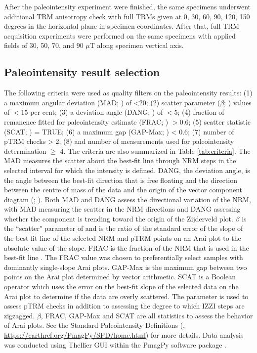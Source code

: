 \documentclass[draft]{agujournal2019}
\begin{document}
After the paleointensity experiment were finished, the same specimens underwent additional TRM anisotropy check with full TRMs given at 0, 30, 60, 90, 120, 150 degrees in the horizontal plane in specimen coordinates. After that, full TRM acquisition experiments were performed on the same specimens with applied fields of 30, 50, 70, and 90 $\mu$T along specimen vertical axis. 

\subsection*{Paleointensity result selection}
The following criteria were used as quality filters on the paleointensity results: (1) a maximum angular deviation (MAD; ) of <20\textdegree; (2) scatter parameter ($\beta$; ) values of $<$15 per cent; (3) a deviation angle (DANG; ) of $<$5\textdegree; (4) fraction of remanence fitted for paleointensity estimate (FRAC; ) $>$0.6; (5) scatter statistic (SCAT; ) = TRUE; (6) a maximum gap (GAP-Max; ) < 0.6; (7) number of pTRM checks > 2; (8) and number of measurements used for paleointensity determination $≥$ 4. The criteria are also summarized in Table \ref{tab:criteria}. The MAD measures the scatter about the best-fit line through NRM steps in the selected interval for which the intensity is defined. DANG, the deviation angle, is the angle between the best-fit direction that is free floating and the direction between the centre of mass of the data and the origin of the vector component diagram (; ). Both MAD and DANG assess the directional variation of the NRM, with MAD measuring the scatter in the NRM directions and DANG assessing whether the component is trending toward the origin of the Zijderveld plot. $\beta$ is the ``scatter" parameter of  and is the ratio of the standard error of the slope of the best-fit line of the selected NRM and pTRM points on an Arai plot to the absolute value of the slope. FRAC is the fraction of the NRM that is used in the best-fit line \cite{Shaar2013a}. The FRAC value was chosen to preferentially select samples with dominantly single-slope Arai plots. GAP-Max is the maximum gap between two points on the Arai plot determined by vector arithmetic. SCAT is a Boolean operator which uses the error on the best-fit slope of the selected data on the Arai plot to determine if the data are overly scattered. The parameter is used to assess pTRM checks in addition to assessing the degree to which IZZI steps are zigzagged. $\beta$, FRAC, GAP-Max and SCAT are all statistics to assess the behavior of Arai plots. See the Standard Paleointensity Definitions (, \url{https://earthref.org/PmagPy/SPD/home.html}) for more details. Data analysis was conducted using Thellier GUI \cite{Shaar2013a} within the PmagPy software package \cite{Tauxe2016a}.
\end{document}
